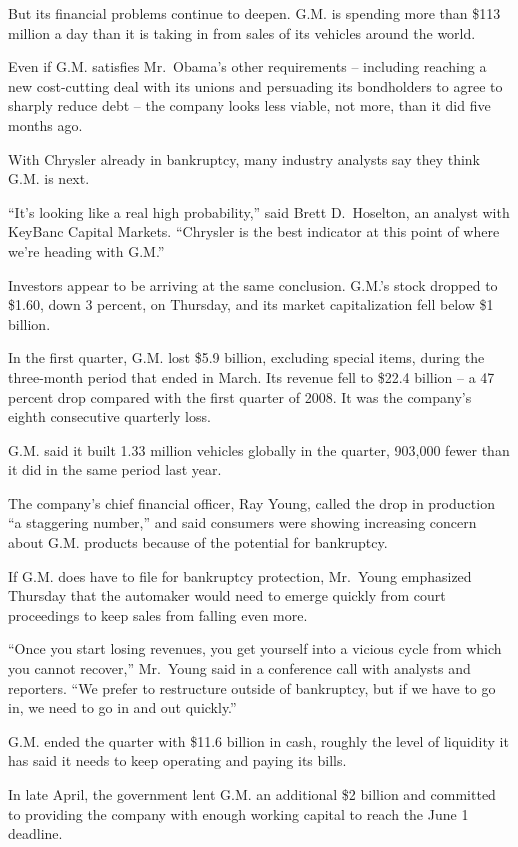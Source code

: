 \documentclass[12pt,a4paper,onecolumn]{article}
\begin{document}
But its financial problems continue to deepen. G.M. is spending more than \$113 million a day than
it is taking in from sales of its vehicles around the world.

Even if G.M. satisfies Mr.~Obama's other requirements -- including reaching a new cost-cutting deal
with its unions and persuading its bondholders to agree to sharply reduce debt -- the company looks
less viable, not more, than it did five months ago.

With Chrysler already in bankruptcy, many industry analysts say they think G.M. is next.

``It's looking like a real high probability,'' said Brett D.~Hoselton, an analyst with KeyBanc
Capital Markets. ``Chrysler is the best indicator at this point of where we're heading with G.M.''

Investors appear to be arriving at the same conclusion. G.M.'s stock dropped to \$1.60, down 3
percent, on Thursday, and its market capitalization fell below \$1 billion.

In the first quarter, G.M. lost \$5.9 billion, excluding special items, during the three-month
period that ended in March. Its revenue fell to \$22.4 billion -- a 47 percent drop compared with
the first quarter of 2008. It was the company's eighth consecutive quarterly loss.

G.M. said it built 1.33 million vehicles globally in the quarter, 903,000 fewer than it did in the
same period last year.

The company's chief financial officer, Ray Young, called the drop in production ``a staggering
number,'' and said consumers were showing increasing concern about G.M. products because of the
potential for bankruptcy.

If G.M. does have to file for bankruptcy protection, Mr.~Young emphasized Thursday that the
automaker would need to emerge quickly from court proceedings to keep sales from falling even more.

``Once you start losing revenues, you get yourself into a vicious cycle from which you cannot
recover,'' Mr.~Young said in a conference call with analysts and reporters. ``We prefer to
restructure outside of bankruptcy, but if we have to go in, we need to go in and out quickly.''

G.M. ended the quarter with \$11.6 billion in cash, roughly the level of liquidity it has said it
needs to keep operating and paying its bills.

In late April, the government lent G.M. an additional \$2 billion and committed to providing the
company with enough working capital to reach the June 1 deadline.
\end{document}
